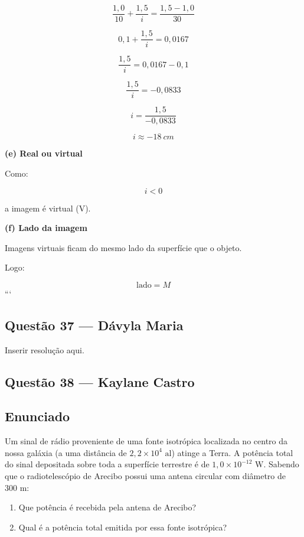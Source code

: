 \documentclass[12pt,a4paper]{article}
\begin{document}
\[
\frac{1,0}{10}
+
\frac{1,5}{i}
=
\frac{1,5-1,0}{30}
\]

\[
0,1+\frac{1,5}{i}
=
0,0167
\]

\[
\frac{1,5}{i}
=
0,0167-0,1
\]

\[
\frac{1,5}{i}
=
-0,0833
\]

\[
i=\frac{1,5}{-0,0833}
\]

\[
i\approx-18\ cm
\]

\vspace{0.5cm}

\textbf{(e) Real ou virtual}

Como:

\[
i<0
\]

a imagem é virtual (V).

\vspace{0.5cm}

\textbf{(f) Lado da imagem}

Imagens virtuais ficam do mesmo lado da superfície que o objeto.

Logo:

\[
\text{lado} = M
\]
```


\subsection{Questão 37 — Dávyla Maria}
Inserir resolução aqui.

\subsection{Questão 38 — Kaylane Castro}
\subsection*{Enunciado}

Um sinal de rádio proveniente de uma fonte isotrópica localizada no centro da nossa galáxia (a uma distância de $2,2 \times 10^4 \text{ al}$) atinge a Terra. A potência total do sinal depositada sobre toda a superfície terrestre é de $1,0 \times 10^{-12} \text{ W}$. Sabendo que o radiotelescópio de Arecibo possui uma antena circular com diâmetro de $300 \text{ m}$:

\begin{enumerate}
    \item[\textbf{(a)}] Que potência é recebida pela antena de Arecibo?
    \item[\textbf{(b)}] Qual é a potência total emitida por essa fonte isotrópica?
\end{enumerate}
\end{document}
